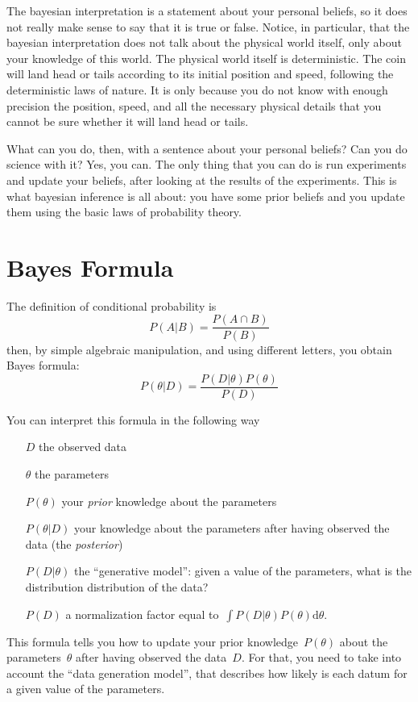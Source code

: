 The bayesian interpretation is a statement about your personal beliefs, so it
does not really make sense to say that it is true or false.  Notice, in
particular, that the bayesian interpretation does not talk about the physical
world itself, only about your knowledge of this world.  The physical world
itself is deterministic.  The coin will land head or tails according to its
initial position and speed, following the deterministic laws of nature.  It
is only because you do not know with enough precision the position, speed,
and all the necessary physical details that you cannot be sure whether it
will land head or tails.

What can you do, then, with a sentence about your personal beliefs?  Can you
do science with it?  Yes, you can.  The only thing that you can do is run
experiments and update your beliefs, after looking at the results of the
experiments.  This is what bayesian inference is all about: you have some
prior beliefs and you update them using the basic laws of probability theory.

\section{Bayes Formula}

The definition of conditional probability is
$$
P(A|B)=\frac{P(A\cap B)}{P(B)}
$$
then, by simple algebraic manipulation, and using different letters, you
obtain Bayes formula:
$$
P(\theta|D)=\frac{P(D|\theta)P(\theta)}{P(D)}
$$

You can interpret this formula in the following way

\begin{itemize}
	\item[$D$] the observed data
	\item[$\theta$] the parameters
	\item[$P(\theta)$] your \emph{prior} knowledge about the parameters
	\item[$P(\theta|D)$] your knowledge about the parameters after having
		observed the data (the \emph{posterior})
	\item[$P(D|\theta)$] the ``generative model'': given a value of the
		parameters, what is the distribution distribution of the data?
	\item[$P(D)$] a normalization factor equal to~$\int
		P(D|\theta)P(\theta)\mathrm{d}\theta$.
\end{itemize}

This formula tells you how to update your prior knowledge~$P(\theta)$ about
the parameters~$\theta$ after having observed the data~$D$.  For that, you
need to take into account the ``data generation model'', that describes how
likely is each datum for a given value of the parameters.

